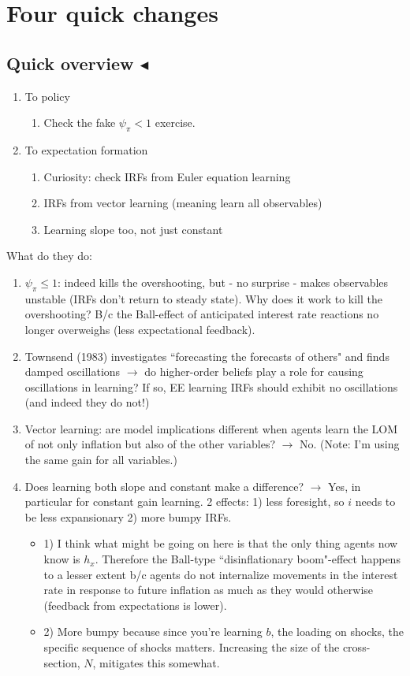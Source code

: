 \documentclass[11pt]{article}
\renewcommand{\[}{\begin{equation}}
\renewcommand{\]}{\end{equation}}
\begin{document}
\newpage
\section{Four quick changes}\label{changes}
\subsection{Quick overview $\blacktriangleleft$}
\begin{enumerate}
\item To policy
\begin{enumerate}
\item Check the fake $\psi_{\pi} < 1$ exercise.
\end{enumerate}
\item To expectation formation
\begin{enumerate}
\item Curiosity: check IRFs from Euler equation learning
\item IRFs from vector learning (meaning learn all observables)
\item Learning slope too, not just constant
\end{enumerate}
\end{enumerate}

What do they do:
\begin{enumerate}
\item $\psi_{\pi} \leq 1$: indeed kills the overshooting, but - no surprise - makes observables unstable (IRFs don't return to steady state). Why does it work to kill the overshooting? B/c the Ball-effect of anticipated interest rate reactions no longer overweighs (less expectational feedback).
\item Townsend (1983) investigates ``forecasting the forecasts of others" and finds damped oscillations $\rightarrow$ do higher-order beliefs play a role for causing oscillations in learning? If so, EE learning IRFs should exhibit no oscillations (and indeed they do not!)
\item Vector learning: are model implications different when agents learn the LOM of not only inflation but also of the other variables? $\rightarrow$ No. (Note: I'm using the same gain for all variables.)
\item Does learning both slope and constant make a difference? $\rightarrow$ Yes, in particular for constant gain learning. 2 effects: 1) less foresight, so $i$ needs to be less expansionary 2) more bumpy IRFs.
\begin{itemize}
\item[] 1) I think what might be going on here is that the only thing agents now know is $h_x$. Therefore the Ball-type ``disinflationary boom"-effect happens to a lesser extent b/c agents do not internalize movements in the interest rate in response to future inflation as much as they would otherwise (feedback from expectations is lower).
\item[] 2) More bumpy because since you're learning $b$, the loading on shocks, the specific sequence of shocks matters. Increasing the size of the cross-section, $N$, mitigates this somewhat. 
\end{itemize}
\end{enumerate}
\end{document}
